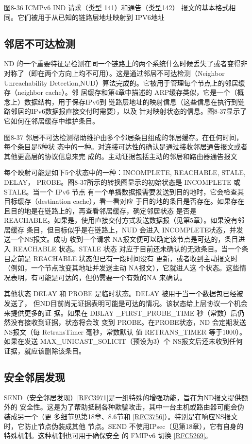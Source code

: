 图8-36 ICMPv6 IND 请求（类型 141）和通告（类型142）
报文的基本格式相同。它们被用于从已知的链路层地址映射到 IPV6地址

\subsection{邻居不可达检测}

ND 的一个重要特征是检测在同一个链路上的两个系统什么时候丢失了或者变得非
对称了（即在两个方向上均不可用）。这是通过邻居不可达检测（Neighbor Unreachability
Detection,NUD）算法完成的。它被用于管理每个节点上的邻居缓存（neighbor cache）。邻
居缓存和第4章中描述的 ARP缓存类似，它是一个（概念上）数据结构，用于保存IPv6到
链路层地址的映射信息（这些信息在执行到链路邻居的IPv6数据报直接交付时需要），以及
针对映射状态的信息。图8-37显示了它如何在邻居缓存中维护条目。

图8-37 邻居不可达检测帮助维护由多个邻居条目组成的邻居缓存。在任何时间，每个条目是5种状
态中的一种。对连接可达性的确认是通过接收邻居通告报文或者其他更高层的协议信息来完
成的。主动证据包括主动的邻居和路由器通告报文

每个映射可能是如下5个状态中的一种：INCOMPLETE, REACHABLE, STALE, DELAY，
PROBE。图8-37所示的转换图显示的初始状态是 INCOMPLETE 或 STALE。当一个 IPv6 节点
有一个单播数据报需要发送到目的地时，它会检查其目标缓存（destination cache），看一看对应
于目的地的条目是否存在。如果存在且目的地是在链路上的，再查看邻居缓存，确定邻居状态
是否是 REACHABLE。如果是，使用直接交付方式发送数据报（见第5章）。如果没有邻居缓存
条目，但目标似乎是在链路上，NUD 会进入 INCOMPLETE状态，并发送一个NS报文。成功
收到一个请求 NA报文便可以确定该节点是可达的，条目进入 REACHABLE 状态。STALE 状态
对应于目前还未确认的无效条目。当一个条目之前是 REACHABLE 状态但已有一段时间没有
更新，或者收到主动报文时（例如，一个节点改变其地址并发送主动 NA报文），它就进人这
个状态。这些情况表明，有可能是可达的，但仍需要一个有效的NA 来确认。

其他状态 DELAY 和 PROBE 是临时状态。DELAY 被用于当一个数据包已经被发送了，
但ND目前尚无证据表明可能是可达的情况。该状态给上层协议一个机会来提供更多的证
据。如果在 DBLAY \_FIRST\_PROBE\_TIME 秒（常数）后仍然没有接收到证据，状态将会改
变到 PROBE。在PROBE状态，ND 会定期发送NS报文（每 RetransTimer 毫秒，常数默认
值 RETRANS\_TIMER 等于1000）。如果在发送 MAX\_UNICAST\_SOLICIT（预设为3）个
NS报文后还未收到任何证据，就应该删除该条目。

\subsection{安全邻居发现}
SEND（安全邻居发现）\href{https://www.rfc-editor.org/rfc/rfc3971}{[RFC3971]}是一组特殊的增强功能，旨在为ND报文提供额外的
安全性。这是为了帮助抵制各种欺骗攻击，其中一台主机或路由器可能会伪装成另一个（更
多细节见第18章、8.6节和 \href{https://www.rfc-editor.org/rfc/rfc3756}{[RFC3756]}）。特别是在响应NS报文时，它防止节点伪装成其他
节点。SEND 不使用IPsec（见第18章），它有自身的特殊机制。这种机制也可用于确保安全
的 FMIPv6 切换 \href{https://www.rfc-editor.org/rfc/rfc5269}{[RFC5269]}。


